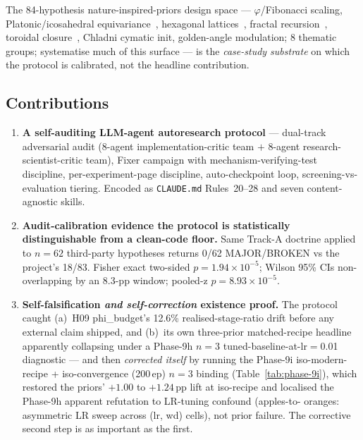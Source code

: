 \documentclass{article}
\begin{document}
The 84-hypothesis nature-inspired-priors design space ---
$\varphi$/Fibonacci scaling, Platonic/icosahedral
equivariance~\citep{cohen2019spherical, islam2025platonic}, hexagonal
lattices~\citep{hoogeboom2018hexaconv}, fractal
recursion~\citep{larsson2017fractalnet}, toroidal
closure~\citep{pittorino2022toroidal}, Chladni cymatic init,
golden-angle modulation; 8 thematic groups; \citet{bronstein2021gdl}
systematise much of this surface --- is the \emph{case-study substrate}
on which the protocol is calibrated, not the headline contribution.

\subsection{Contributions}
\label{sec:contributions}

\begin{enumerate}
  \item \textbf{A self-auditing LLM-agent autoresearch protocol} ---
    dual-track adversarial audit (8-agent implementation-critic team
    $+$ 8-agent research-scientist-critic team), Fixer campaign with
    mechanism-verifying-test discipline, per-experiment-page discipline,
    auto-checkpoint loop, screening-vs-evaluation tiering. Encoded as
    \texttt{CLAUDE.md} Rules~20--28 and seven content-agnostic skills.
  \item \textbf{Audit-calibration evidence the protocol is statistically
    distinguishable from a clean-code floor.} Same Track-A doctrine
    applied to $n{=}62$ third-party hypotheses returns 0/62
    MAJOR/BROKEN vs the project's 18/83. Fisher exact two-sided
    $p = 1.94 \times 10^{-5}$; Wilson 95\% CIs non-overlapping by an
    8.3-pp window; pooled-z $p = 8.93 \times 10^{-5}$.
  \item \textbf{Self-falsification {\em and self-correction} existence
    proof.} The protocol caught (a)~H09 phi\_budget's 12.6\%
    realised-stage-ratio drift before any external claim shipped, and
    (b)~its own three-prior matched-recipe headline apparently
    collapsing under a Phase-9h $n{=}3$ tuned-baseline-at-lr$=$0.01
    diagnostic --- and then \emph{corrected itself} by running the
    Phase-9i iso-modern-recipe + iso-convergence (200\,ep) $n{=}3$
    binding (Table~\ref{tab:phase-9i}), which restored the priors'
    ${+}1.00$ to ${+}1.24$\,pp lift at iso-recipe and localised the
    Phase-9h apparent refutation to LR-tuning confound (apples-to-
    oranges: asymmetric LR sweep across (lr, wd) cells), not prior
    failure. The corrective second step is as important as the first.

\end{enumerate}
\end{document}
